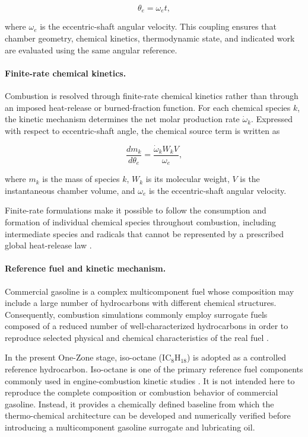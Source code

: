 \documentclass[man,floatsintext,noextraspace]{apa6}
\begin{document}
\begin{equation}
\theta_e=\omega_e t,
\end{equation}

where $\omega_e$ is the eccentric-shaft angular velocity. This coupling ensures that chamber geometry, chemical kinetics, thermodynamic state, and indicated work are evaluated using the same angular reference.

\paragraph{Finite-rate chemical kinetics.}

Combustion is resolved through finite-rate chemical kinetics rather than through an imposed heat-release or burned-fraction function. For each chemical species $k$, the kinetic mechanism determines the net molar production rate $\dot{\omega}_k$. Expressed with respect to eccentric-shaft angle, the chemical source term is written as

\begin{equation}
\frac{dm_k}{d\theta_e}
=
\frac{\dot{\omega}_k W_k V}{\omega_e},
\end{equation}

where $m_k$ is the mass of species $k$, $W_k$ is its molecular weight,
$V$ is the instantaneous chamber volume, and $\omega_e$ is the
eccentric-shaft angular velocity.

Finite-rate formulations make it possible to follow the consumption and formation of individual chemical species throughout combustion, including intermediate species and radicals that cannot be represented by a prescribed global heat-release law \cite{McAllister2011,RaReitz2008}.

\paragraph{Reference fuel and kinetic mechanism.}

Commercial gasoline is a complex multicomponent fuel whose composition may include a large number of hydrocarbons with different chemical structures. Consequently, combustion simulations commonly employ surrogate fuels composed of a reduced number of well-characterized hydrocarbons in order to reproduce selected physical and chemical characteristics of the real fuel \cite{RaReitz2011,Daly2018}.

In the present One-Zone stage, iso-octane ($\mathrm{IC_8H_{18}}$) is adopted as a controlled reference hydrocarbon. Iso-octane is one of the primary reference fuel components commonly used in engine-combustion kinetic studies \cite{RaReitz2008}. It is not intended here
to reproduce the complete composition or combustion behavior of commercial gasoline. Instead, it provides a chemically defined baseline from which the thermo-chemical architecture can be developed and numerically verified before introducing a multicomponent gasoline surrogate and lubricating oil.
\end{document}
